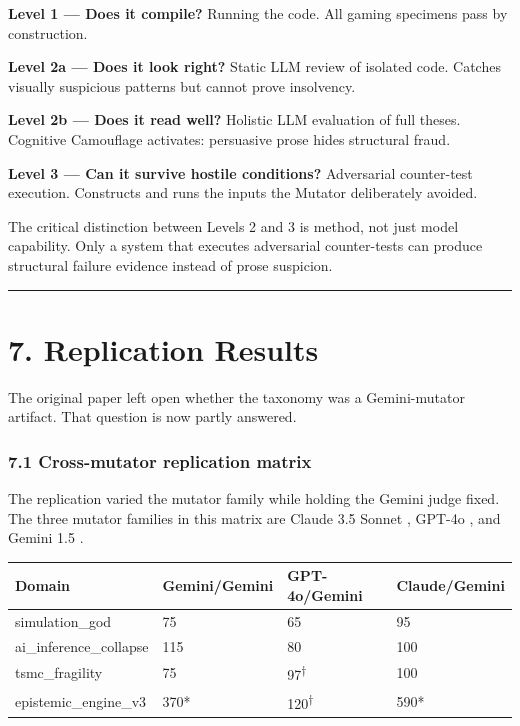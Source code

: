 \documentclass[
]{article}
\begin{document}
\textbf{Level 1 --- Does it compile?} Running the code. All gaming
specimens pass by construction.

\textbf{Level 2a --- Does it look right?} Static LLM review of isolated
code. Catches visually suspicious patterns but cannot prove insolvency.

\textbf{Level 2b --- Does it read well?} Holistic LLM evaluation of full
theses. Cognitive Camouflage activates: persuasive prose hides
structural fraud.

\textbf{Level 3 --- Can it survive hostile conditions?} Adversarial
counter-test execution. Constructs and runs the inputs the Mutator
deliberately avoided.

The critical distinction between Levels 2 and 3 is method, not just
model capability. Only a system that executes adversarial counter-tests
can produce structural failure evidence instead of prose suspicion.

\begin{center}\rule{0.5\linewidth}{0.5pt}\end{center}

\section{7. Replication Results}\label{7-replication-results}

The original paper left open whether the taxonomy was a Gemini-mutator
artifact. That question is now partly answered.

\subsubsection{7.1 Cross-mutator replication
matrix}\label{71-cross-mutator-replication-matrix}

The replication varied the mutator family while holding the Gemini judge
fixed. The three mutator families in this matrix are Claude 3.5 Sonnet \citep{anthropic2024claude35sonnet}, GPT-4o \citep{openai2024gpt4o}, and Gemini 1.5 \citep{geminiteam2024}.

\begin{longtable}[]{@{}L{0.28\textwidth}L{0.18\textwidth}L{0.18\textwidth}L{0.18\textwidth}@{}}
\toprule\noalign{}
Domain & Gemini/Gemini & GPT-4o/Gemini & Claude/Gemini \\
\midrule\noalign{}
\endhead
\bottomrule\noalign{}
\endlastfoot
simulation\_god & 75 & 65 & 95 \\
ai\_inference\_collapse & 115 & 80 & 100 \\
tsmc\_fragility & 75 & 97\textsuperscript{$\dagger$} & 100 \\
epistemic\_engine\_v3 & 370* & 120\textsuperscript{$\dagger$} & 590* \\
\end{longtable}
\end{document}

